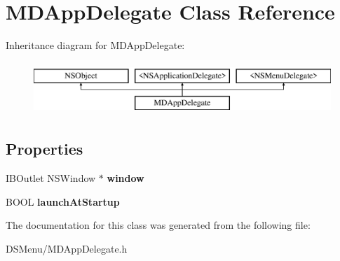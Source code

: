 \hypertarget{interface_m_d_app_delegate}{\section{M\-D\-App\-Delegate Class Reference}
\label{interface_m_d_app_delegate}
}
Inheritance diagram for M\-D\-App\-Delegate\-:\begin{figure}[H]
\begin{center}
\leavevmode
\includegraphics[height=2.000000cm]{interface_m_d_app_delegate}
\end{center}
\end{figure}
\subsection*{Properties}
\begin{DoxyCompactItemize}
\item 
\hypertarget{interface_m_d_app_delegate_a0758151aaf56aadb705303b2715081c8}{I\-B\-Outlet N\-S\-Window $\ast$ {\bfseries window}}\label{interface_m_d_app_delegate_a0758151aaf56aadb705303b2715081c8}

\item 
\hypertarget{interface_m_d_app_delegate_a3344f6b269fb5ffe6c46ef57024f946c}{B\-O\-O\-L {\bfseries launch\-At\-Startup}}\label{interface_m_d_app_delegate_a3344f6b269fb5ffe6c46ef57024f946c}

\end{DoxyCompactItemize}


The documentation for this class was generated from the following file\-:\begin{DoxyCompactItemize}
\item 
D\-S\-Menu/M\-D\-App\-Delegate.\-h\end{DoxyCompactItemize}
